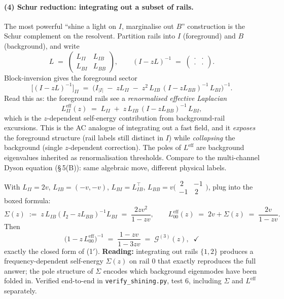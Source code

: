 \documentclass[11pt,a4paper]{article}
\begin{document}
\paragraph{(4) Schur reduction: integrating out a subset of rails.}
The most powerful ``shine a light on $I$, marginalise out $B$''
construction is the Schur complement on the resolvent. Partition
rails into $I$ (foreground) and $B$ (background), and write
\[
L \;=\; \begin{pmatrix} L_{II} & L_{IB} \\ L_{BI} & L_{BB} \end{pmatrix},
\qquad
(I-zL)^{-1}
\;=\;
\begin{pmatrix} \cdot & \cdot \\ \cdot & \cdot \end{pmatrix}.
\]
Block-inversion gives the foreground sector
\[
\big[(I-zL)^{-1}\big]_{II}
\;=\;
\Big(I_{|I|} \;-\; z L_{II} \;-\; z^{2}\,L_{IB}\,(I-zL_{BB})^{-1}\,L_{BI}\Big)^{-1}.
\]
Read this as: the foreground rails see a \emph{renormalised effective
Laplacian}
\[
\boxed{\;
L^{\text{eff}}_{II}(z) \;=\; L_{II} \;+\; z\,L_{IB}\,(I-zL_{BB})^{-1}\,L_{BI},
\;}
\]
which is the $z$-dependent self-energy contribution from background-rail
excursions. This is the AC analogue of integrating out a fast field, and
it \emph{exposes} the foreground structure (rail labels still distinct in
$I$) while \emph{collapsing} the background (single $z$-dependent
correction). The poles of $L^{\text{eff}}$ are background eigenvalues
inherited as renormalisation thresholds. Compare to the multi-channel
Dyson equation (\S\,5(B)): same algebraic move, different physical
labels.

\begin{examplebox}[title={Example (4$'$)\;\;Schur reduction at $n{=}3$ uniform: integrate out rails $\{1,2\}$}]
With $L_{II}{=}2v$,\; $L_{IB}{=}(-v,-v)$,\; $L_{BI}{=}L_{IB}^{\top}$,\;
$L_{BB}{=}v\!\big(\begin{smallmatrix}\,2 & -1\\ -1 & \,2\end{smallmatrix}\big)$,
plug into the boxed formula:
\[
\Sigma(z) \;:=\; z\,L_{IB}(I_{2}-zL_{BB})^{-1}L_{BI}
\;=\; \frac{2zv^{2}}{1-zv},
\qquad
L^{\text{eff}}_{00}(z) \;=\; 2v + \Sigma(z) \;=\; \frac{2v}{1-zv}.
\]
Then
\[
\big(1 - z\,L^{\text{eff}}_{00}\big)^{-1}
\;=\; \frac{1-zv}{1-3zv}
\;=\; \mathcal G^{(3)}(z),\;\;\checkmark
\]
exactly the closed form of (1$'$). \textbf{Reading:} integrating out
rails $\{1,2\}$ produces a frequency-dependent self-energy
$\Sigma(z)$ on rail $0$ that exactly reproduces the full answer; the
pole structure of $\Sigma$ encodes which background eigenmodes have
been folded in. Verified end-to-end in \texttt{verify\_shining.py},
test 6, including $\Sigma$ and $L^{\text{eff}}$ separately.
\end{examplebox}
\end{document}
